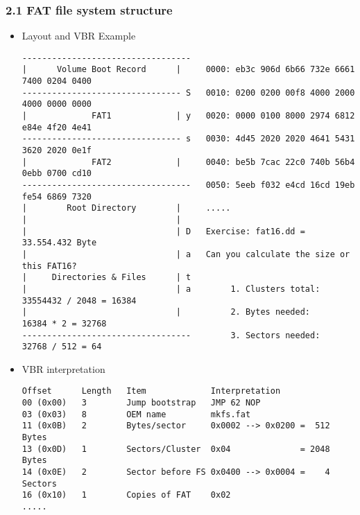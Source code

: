 \begin{frame}[fragile]
  \frametitle{2.1 FAT file system structure}
    \begin{itemize}
	    \item Layout and VBR Example
  \begin{lstlisting}[basicstyle=\tiny]
----------------------------------
|      Volume Boot Record      |     0000: eb3c 906d 6b66 732e 6661 7400 0204 0400
-------------------------------- S   0010: 0200 0200 00f8 4000 2000 4000 0000 0000
|             FAT1             | y   0020: 0000 0100 8000 2974 6812 e84e 4f20 4e41
-------------------------------- s   0030: 4d45 2020 2020 4641 5431 3620 2020 0e1f
|             FAT2             |     0040: be5b 7cac 22c0 740b 56b4 0ebb 0700 cd10
----------------------------------   0050: 5eeb f032 e4cd 16cd 19eb fe54 6869 7320
|        Root Directory        |     .....
|                              |
|                              | D   Exercise: fat16.dd = 33.554.432 Byte
|                              | a   Can you calculate the size or this FAT16?
|     Directories & Files      | t
|                              | a        1. Clusters total: 33554432 / 2048 = 16384
|                              |          2. Bytes needed:         16384 * 2 = 32768
----------------------------------        3. Sectors needed:     32768 / 512 = 64
  \end{lstlisting}
	    \item VBR interpretation                      
  \begin{lstlisting}[basicstyle=\tiny]
Offset      Length   Item             Interpretation
00 (0x00)   3        Jump bootstrap   JMP 62 NOP
03 (0x03)   8        OEM name         mkfs.fat
11 (0x0B)   2        Bytes/sector     0x0002 --> 0x0200 =  512 Bytes
13 (0x0D)   1        Sectors/Cluster  0x04              = 2048 Bytes
14 (0x0E)   2        Sector before FS 0x0400 --> 0x0004 =    4 Sectors
16 (0x10)   1        Copies of FAT    0x02
.....
  \end{lstlisting}
    \end{itemize}
\end{frame}



